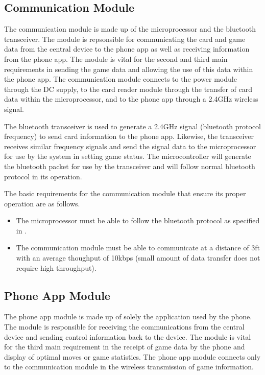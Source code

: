 \documentclass[12pt]{article}
\begin{document}
\subsection{Communication Module}

The communication module is made up of the microprocessor and the bluetooth transceiver. The module is repsonsible for communicating the card and game data from the central device to the phone app as well as receiving information from the phone app. The module is vital for the second and third main requirements in sending the game data and allowing the use of this data within the phone app. The communication module connects to the power module through the DC supply, to the card reader module through the transfer of card data within the microprocessor, and to the phone app through a 2.4GHz wireless signal.

The bluetooth transceiver is used to generate a 2.4GHz signal (bluetooth protocol frequency) to send card information to the phone app. Likewise, the transceiver receives similar frequency signals and send the signal data to the microprocessor for use by the system in setting game status. The microcontroller will generate the bluetooth packet for use by the transceiver and will follow normal bluetooth protocol in its operation.

The basic requirements for the communication module that ensure its proper operation are as follows.

\begin{itemize}
\item The microprocessor must be able to follow the bluetooth protocol as specified in \cite{IEEE_bt}.
\item The communication module must be able to communicate at a distance of 3ft with an average thoughput of 10kbps (small amount of data transfer does not require high throughput).
\end{itemize}

\subsection{Phone App Module}

The phone app module is made up of solely the application used by the phone. The module is responsible for receiving the communications from the central device and sending control information back to the device. The module is vital for the third main requirement in the receipt of game data by the phone and display of optimal moves or game statistics. The phone app module connects only to the communication module in the wireless transmission of game information.
\end{document}
